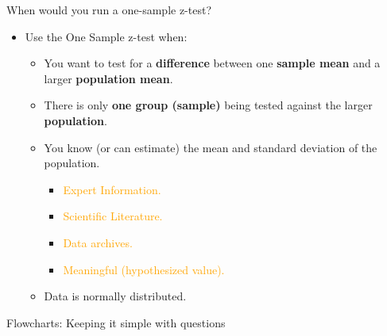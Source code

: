 \documentclass[
  ignorenonframetext,
]{beamer}
\providecommand{\tightlist}{%
  \setlength{\itemsep}{0pt}\setlength{\parskip}{0pt}}
\begin{document}
\begin{frame}{When would you run a one-sample z-test?}
\label{when-would-you-run-a-one-sample-z-test-1}
\begin{itemize}
\tightlist
\item
  Use the One Sample z-test when:

  \begin{itemize}
  \tightlist
  \item
    You want to test for a \textbf{difference} between one
    \textbf{sample mean} and a larger \textbf{population mean}.
  \item
    There is only \textbf{one group (sample)} being tested against the
    larger \textbf{population}.
  \item
    You know (or can estimate) the mean and standard deviation of the
    population.

    \begin{itemize}
    \tightlist
    \item
      \textcolor{orange}{Expert Information.}
    \item
      \textcolor{orange}{Scientific Literature.}
    \item
      \textcolor{orange}{Data archives.}
    \item
      \textcolor{orange}{Meaningful (hypothesized value).}
    \end{itemize}
  \item
    Data is normally distributed.
  \end{itemize}
\end{itemize}
\end{frame}

\begin{frame}{Flowcharts: Keeping it simple with questions}
\label{flowcharts-keeping-it-simple-with-questions}
\end{frame}
\end{document}
